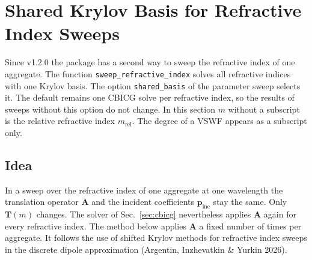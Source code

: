 \documentclass[11pt,a4paper]{article}
\begin{document}
\section{Shared Krylov Basis for Refractive Index Sweeps}
\label{sec:shared-basis}

Since v1.2.0 the package has a second way to sweep the refractive index of one aggregate.
The function \texttt{sweep\_refractive\_index} solves all refractive indices with one Krylov basis.
The option \texttt{shared\_basis} of the parameter sweep selects it.
The default remains one CBICG solve per refractive index, so the results of sweeps without this option do not change.
In this section $m$ without a subscript is the relative refractive index $m_\mathrm{rel}$.
The degree of a VSWF appears as a subscript only.

\subsection{Idea}
In a sweep over the refractive index of one aggregate at one wavelength the translation operator $\mathbf{A}$ and the incident coefficients $\bm{p}_\mathrm{inc}$ stay the same.
Only $\mathbf{T}(m)$ changes.
The solver of Sec.~\ref{sec:cbicg} nevertheless applies $\mathbf{A}$ again for every refractive index.
The method below applies $\mathbf{A}$ a fixed number of times per aggregate.
It follows the use of shifted Krylov methods for refractive index sweeps in the discrete dipole approximation (Argentin, Inzhevatkin \& Yurkin 2026).
\end{document}
